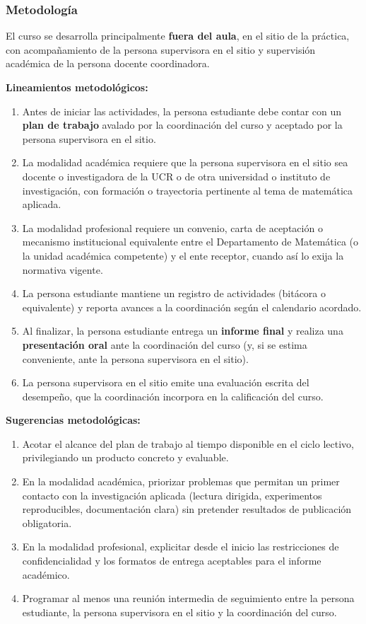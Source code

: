 \begin{refsection}
\subsubsection*{Metodología}

El curso se desarrolla principalmente \textbf{fuera del aula}, en el sitio de la práctica, con acompañamiento de la persona supervisora en el sitio y supervisión académica de la persona docente coordinadora.

\noindent \textbf{Lineamientos metodológicos:}

\begin{enumerate}
    \item Antes de iniciar las actividades, la persona estudiante debe contar con un \textbf{plan de trabajo} avalado por la coordinación del curso y aceptado por la persona supervisora en el sitio.
    \item La modalidad académica requiere que la persona supervisora en el sitio sea docente o investigadora de la UCR o de otra universidad o instituto de investigación, con formación o trayectoria pertinente al tema de matemática aplicada.
    \item La modalidad profesional requiere un convenio, carta de aceptación o mecanismo institucional equivalente entre el Departamento de Matemática (o la unidad académica competente) y el ente receptor, cuando así lo exija la normativa vigente.
    \item La persona estudiante mantiene un registro de actividades (bitácora o equivalente) y reporta avances a la coordinación según el calendario acordado.
    \item Al finalizar, la persona estudiante entrega un \textbf{informe final} y realiza una \textbf{presentación oral} ante la coordinación del curso (y, si se estima conveniente, ante la persona supervisora en el sitio).
    \item La persona supervisora en el sitio emite una evaluación escrita del desempeño, que la coordinación incorpora en la calificación del curso.
\end{enumerate}

\textbf{Sugerencias metodológicas:}

\begin{enumerate}
    \item Acotar el alcance del plan de trabajo al tiempo disponible en el ciclo lectivo, privilegiando un producto concreto y evaluable.
    \item En la modalidad académica, priorizar problemas que permitan un primer contacto con la investigación aplicada (lectura dirigida, experimentos reproducibles, documentación clara) sin pretender resultados de publicación obligatoria.
    \item En la modalidad profesional, explicitar desde el inicio las restricciones de confidencialidad y los formatos de entrega aceptables para el informe académico.
    \item Programar al menos una reunión intermedia de seguimiento entre la persona estudiante, la persona supervisora en el sitio y la coordinación del curso.
\end{enumerate}


\end{refsection}
